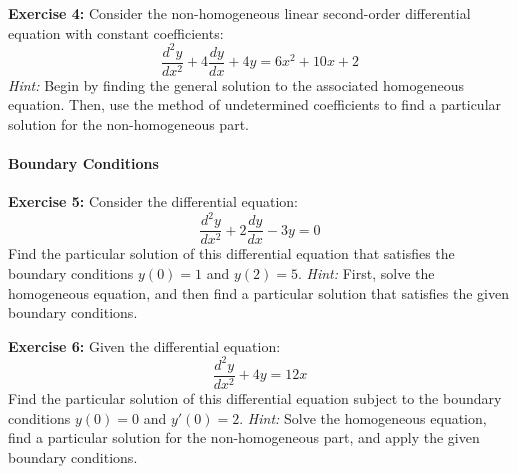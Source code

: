 \documentclass[]{article}
\begin{document}
	\textbf{Exercise 4:}
	Consider the non-homogeneous linear second-order differential equation with constant coefficients:
	\[
	\frac{d^2y}{dx^2} + 4\frac{dy}{dx} + 4y = 6x^2 + 10x + 2
	\]
	\textit{Hint:} Begin by finding the general solution to the associated homogeneous equation. Then, use the method of undetermined coefficients to find a particular solution for the non-homogeneous part.
	
	\paragraph{Boundary Conditions}\mbox{}
	
	\textbf{Exercise 5:}
	Consider the differential equation:
	\[
	\frac{d^2y}{dx^2} + 2\frac{dy}{dx} - 3y = 0
	\]
	Find the particular solution of this differential equation that satisfies the boundary conditions \(y(0) = 1\) and \(y(2) = 5\).
	\textit{Hint:} First, solve the homogeneous equation, and then find a particular solution that satisfies the given boundary conditions.
	
	\textbf{Exercise 6:}
	Given the differential equation:
	\[
	\frac{d^2y}{dx^2} + 4y = 12x
	\]
	Find the particular solution of this differential equation subject to the boundary conditions \(y(0) = 0\) and \(y'(0) = 2\).
	\textit{Hint:} Solve the homogeneous equation, find a particular solution for the non-homogeneous part, and apply the given boundary conditions.
	
	
	
\end{document}
